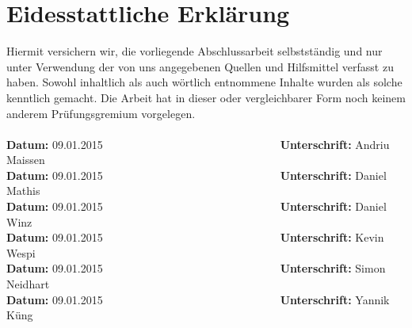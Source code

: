 \section*{Eidesstattliche Erklärung}
\label{erklaerung}
Hiermit versichern wir, die vorliegende Abschlussarbeit selbstständig und nur 
unter Verwendung der von uns angegebenen Quellen und Hilfsmittel verfasst zu 
haben. Sowohl inhaltlich als auch wörtlich entnommene Inhalte wurden als 
solche kenntlich gemacht. Die Arbeit hat in dieser oder vergleichbarer Form 
noch keinem anderem Prüfungsgremium vorgelegen. \\
\\[1.5cm]
\textbf{Datum:}	09.01.2015~~~~~~~~~~~~~~~~~~~~~~~~~~~~~~~~\textbf{Unterschrift:} Andriu Maissen
\\[1.5cm]
\textbf{Datum:}	09.01.2015~~~~~~~~~~~~~~~~~~~~~~~~~~~~~~~~\textbf{Unterschrift:} Daniel Mathis
\\[1.5cm]
\textbf{Datum:}	09.01.2015~~~~~~~~~~~~~~~~~~~~~~~~~~~~~~~~\textbf{Unterschrift:} Daniel Winz
\\[1.5cm]
\textbf{Datum:}	09.01.2015~~~~~~~~~~~~~~~~~~~~~~~~~~~~~~~~\textbf{Unterschrift:} Kevin Wespi
\\[1.5cm]
\textbf{Datum:}	09.01.2015~~~~~~~~~~~~~~~~~~~~~~~~~~~~~~~~\textbf{Unterschrift:} Simon Neidhart
\\[1.5cm]
\textbf{Datum:}	09.01.2015~~~~~~~~~~~~~~~~~~~~~~~~~~~~~~~~\textbf{Unterschrift:} Yannik Küng
